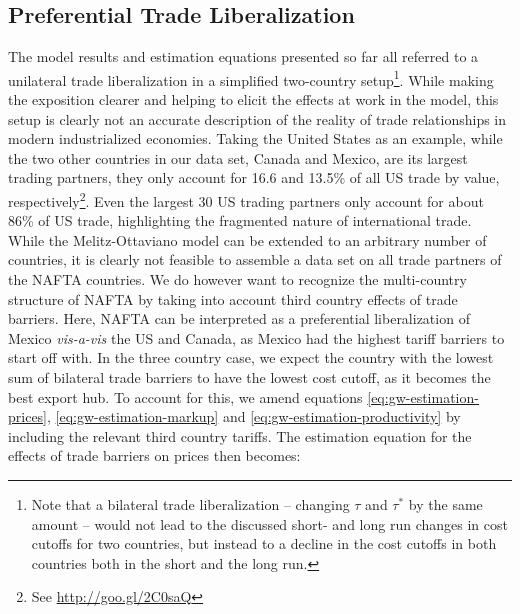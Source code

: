 \documentclass[a4paper,12pt]{article}
\begin{document}
\subsection{Preferential Trade Liberalization}
The model results and estimation equations presented so far all referred to a 
unilateral trade liberalization in a simplified two-country setup\footnote{Note
 that a bilateral trade liberalization -- changing $\tau$ and
 $\tau^*$ by the same amount -- would not lead to the discussed short- and long 
run changes in cost cutoffs for two countries, but instead to a decline in the cost cutoffs in both countries both in the short and the 
long run.}. While making the exposition clearer and helping to elicit the effects at work in the model, this setup is clearly not an accurate description of the reality of trade relationships in modern industrialized economies. Taking the United States as an example, while the two other countries in our data set, Canada and Mexico, are its largest 
trading partners, they only account for 16.6 and 13.5\% of all US trade by value, 
respectively\footnote{See \href{Top U.S. Trade Partners, U.S. International Trade Administration}{http://goo.gl/2C0saQ}}. 
Even the largest 30 US trading partners only account for about 86\% of US trade, highlighting the fragmented nature of international trade. While the Melitz-Ottaviano model can be extended to an arbitrary number of countries, it is clearly not feasible to assemble a data set on all trade partners of the NAFTA countries. We do however want to recognize the multi-country structure of NAFTA by taking into account third country effects of trade barriers. Here, NAFTA can be interpreted as a preferential liberalization of Mexico \textit{vis-a-vis} the US and Canada, as Mexico had the highest tariff barriers to start off with. In the three country case, we expect the country with the lowest sum of bilateral trade barriers to have the lowest cost cutoff, as it becomes the best export hub. To account for this, we amend equations \ref{eq:gw-estimation-prices}, \ref{eq:gw-estimation-markup} and \ref{eq:gw-estimation-productivity} by including the relevant third country tariffs. The estimation equation for the effects of trade barriers on prices then becomes:
\end{document}
